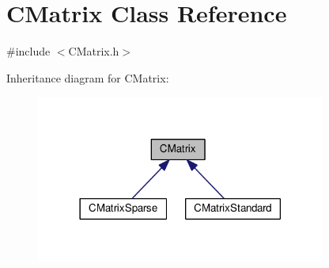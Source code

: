 \hypertarget{classCMatrix}{}\section{C\+Matrix Class Reference}
\label{classCMatrix}


{\ttfamily \#include $<$C\+Matrix.\+h$>$}



Inheritance diagram for C\+Matrix\+:\nopagebreak
\begin{figure}[H]
\begin{center}
\leavevmode
\includegraphics[width=270pt]{classCMatrix__inherit__graph}
\end{center}
\end{figure}
